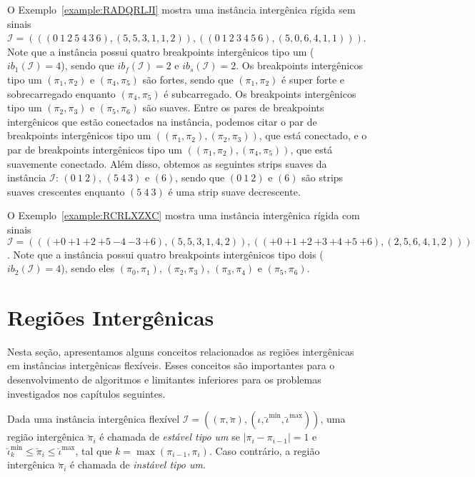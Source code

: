 O Exemplo~\ref{example:RADQRLJI} mostra uma instância intergênica rígida sem sinais $\mathcal{I} = (((0~1~2~5~4~3\allowbreak~6),\allowbreak(5,5,3,1,1,2)),\allowbreak((0~1~2~3~4~5~6),\allowbreak(5,0,6,4,1,1)))$. Note que a instância possui quatro breakpoints intergênicos tipo um ($ib_{1}(\mathcal{I}) = 4$), sendo que $ib_f(\mathcal{I}) = 2$ e $ib_s(\mathcal{I}) = 2$. Os breakpoints intergênicos tipo um $(\pi_1,\pi_2)$ e $(\pi_4,\pi_5)$ são fortes, sendo que $(\pi_1,\pi_2)$ é super forte e sobrecarregado enquanto $(\pi_4,\pi_5)$ é subcarregado. Os breakpoints intergênicos tipo um $(\pi_2,\pi_3)$ e $(\pi_5,\pi_6)$ são suaves. Entre os pares de breakpoints intergênicos que estão conectados na instância, podemos citar o par de breakpoints intergênicos tipo um $((\pi_1,\pi_2),(\pi_2,\pi_3))$, que está conectado, e o par de breakpoints intergênicos tipo um $((\pi_1,\pi_2),(\pi_4,\pi_5))$, que está suavemente conectado. Além disso, obtemos as seguintes strips suaves da instância $\mathcal{I}$: $(0~1~2)$, $(5~4~3)$ e $(6)$, sendo que $(0~1~2)$ e $(6)$ são strips suaves crescentes enquanto $(5~4~3)$ é uma strip suave decrescente.



O Exemplo~\ref{example:RCRLXZXC} mostra uma instância intergênica rígida com sinais $\mathcal{I} = \allowbreak((({+0}~{+1}~{+2}~\allowbreak{+5}~{-4}~{-3}~{+6}),\allowbreak(5,5,3,1,4,2)),\allowbreak(({+0}~{+1}~{+2}~{+3}~{+4}~{+5}~{+6}),\allowbreak(2,5,6,4,1,2)))$. Note que a instância possui quatro breakpoints intergênicos tipo dois ($ib_{2}(\mathcal{I}) = 4$), sendo eles $(\pi_0,\pi_1)$, $(\pi_2,\pi_3)$, $(\pi_3,\pi_4)$ e $(\pi_5,\pi_6)$.



\section{Regiões Intergênicas}

Nesta seção, apresentamos alguns conceitos relacionados as regiões intergênicas em instâncias intergênicas flexíveis. Esses conceitos são importantes para o desenvolvimento de algoritmos e limitantes inferiores para os problemas investigados nos capítulos seguintes.

\begin{definition}
  Dada uma instância intergênica flexível $\mathcal{I} = ((\pi,\breve\pi),(\iota,\breve\iota^{\min},\breve\iota^{\max}))$, uma região intergênica $\breve\pi_i$ é chamada de \emph{estável tipo um} se $|\pi_{i} - \pi_{i - 1}| = 1$ e $\breve\iota^{\min}_k \le \breve\pi_i \le \breve\iota^{\max}$, tal que $k = \max(\pi_{i-1}, \pi_i)$. Caso contrário, a região intergênica $\breve\pi_i$ é chamada de \emph{instável tipo um}. 
\end{definition}


